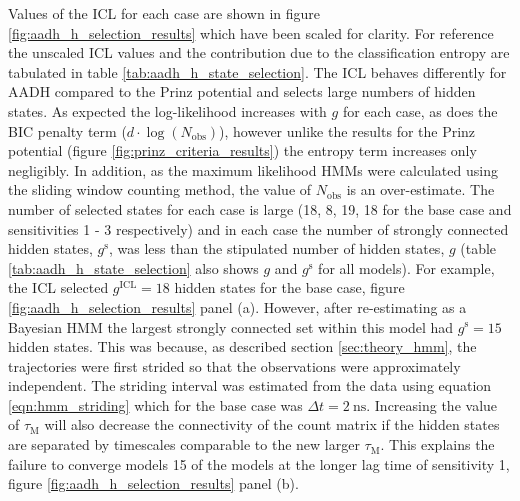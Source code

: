 Values of the ICL for each case are shown in figure \ref{fig:aadh_h_selection_results} which have been scaled for clarity. For reference the unscaled ICL values and the contribution due to the classification entropy are tabulated in table \ref{tab:aadh_h_state_selection}. The ICL behaves differently for AADH compared to the Prinz potential and selects large numbers of hidden states. As expected the log-likelihood increases with $g$ for each case, as does the BIC penalty term ($d\cdot\log{\left(N_{\mathrm{obs}}\right)}$), however unlike the results for the Prinz potential (figure \ref{fig:prinz_criteria_results}) the entropy term increases only negligibly. In addition, as the maximum likelihood HMMs were calculated using the sliding window counting method, the value of $N_{\mathrm{obs}}$ is an over-estimate. The number of selected states for each case is large (18, 8, 19, 18 for the base case and sensitivities 1 - 3 respectively) and in each case the number of strongly connected hidden states, $g^{\mathrm{s}}$, was less than the stipulated number of hidden states, $g$ (table \ref{tab:aadh_h_state_selection} also shows $g$ and $g^{\mathrm{s}}$ for all models). For example, the ICL selected $g^{\mathrm{ICL}}=18$ hidden states for the base case, figure \ref{fig:aadh_h_selection_results} panel (a). However, after re-estimating as a Bayesian HMM the largest strongly connected set within this model had  $g^{\mathrm{s}}=15$ hidden states. This was because, as described section \ref{sec:theory_hmm}, the trajectories were first strided so that the observations were approximately independent. The striding interval was estimated from the data using  equation \ref{eqn:hmm_striding} which for the base case was $\Delta t = \SI{2}{\nano\second}$. Increasing the value of $\tau_{\mathrm{M}}$ will also decrease the connectivity of the count matrix if the hidden states are separated by timescales comparable to the new larger $\tau_{\mathrm{M}}$. This explains the failure to converge models 15 of the models at the longer lag time of sensitivity 1, figure \ref{fig:aadh_h_selection_results} panel (b).   


